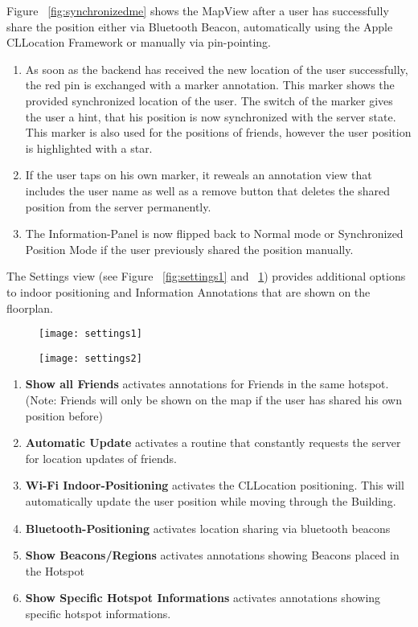 Figure ~\ref{fig:synchronizedme} shows the MapView after a user has successfully share the position either via Bluetooth Beacon, automatically using the Apple CLLocation Framework or manually via pin-pointing.


\begin{enumerate}
\item As soon as the backend has received the new location of the user successfully, the red pin is exchanged with a marker annotation. This marker shows the provided synchronized location of the user. The switch of the marker gives the user a hint, that his position is now synchronized with the server state. This marker is also used for the positions of friends, however the user position is highlighted with a star.
\item If the user taps on his own marker, it reweals an annotation view that includes the user name as well as a remove button that deletes the shared position from the server permanently.

\item The Information-Panel is now flipped back to Normal mode or Synchronized Position Mode if the user previously shared the position manually.
\end{enumerate}


The Settings view (see Figure ~\ref{fig:settings1} and ~\ref{fig:settings2}) provides additional options to indoor positioning and Information Annotations that are shown on the floorplan.

\begin{figure}
\centering
\begin{minipage}{.5\textwidth}
  \centering
  \texttt{[image: settings1]}
  \label{fig:settings1}
\end{minipage}%
\begin{minipage}{.5\textwidth}
  \centering
  \texttt{[image: settings2]}
  \label{fig:settings2}
\end{minipage}
\end{figure}

\begin{enumerate}
\item \textbf{Show all Friends} activates annotations for Friends in the same hotspot. (Note: Friends will only be shown on the map if the user has shared his own position before)
\item \textbf{Automatic Update} activates a routine that constantly requests the server for location updates of friends. 
\item \textbf{Wi-Fi Indoor-Positioning} activates the CLLocation positioning. This will automatically update the user position while moving through the Building.
\item \textbf{Bluetooth-Positioning} activates location sharing via bluetooth beacons
\item \textbf{Show Beacons/Regions} activates annotations showing Beacons placed in the Hotspot
\item \textbf{Show Specific Hotspot Informations} activates annotations showing specific hotspot informations.
\end{enumerate}


